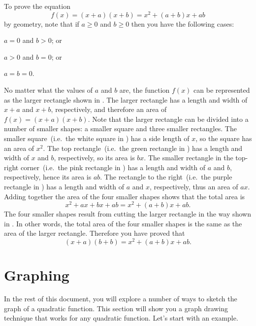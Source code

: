 \documentclass[a4paper,oneside,12pt]{article}
\begin{document}
To prove the equation
\[
f(x)
=
(x + a)(x + b)
=
x^2 + (a + b)x + ab
\]
by geometry, note that if $a \geq 0$ and $b \geq 0$ then you have the
following cases:
\begin{packedenumeral}
\item $a = 0$ and $b > 0$; or

\item $a > 0$ and $b = 0$; or

\item $a = b = 0$.
\end{packedenumeral}
No matter what the values of $a$ and $b$ are, the function $f(x)$ can
be represented as the larger rectangle shown in
.  The larger rectangle has a
length and width of $x + a$ and $x + b$, respectively, and therefore
an area of $f(x) = (x + a)(x + b)$.  Note that the larger rectangle
can be divided into a number of smaller shapes: a smaller square and
three smaller rectangles.  The smaller square~(i.e.~the white square
in ) has a side length of $x$, so
the square has an area of $x^2$.  The top rectangle~(i.e.~the green
rectangle in ) has a length and
width of $x$ and $b$, respectively, so its area is $bx$.  The smaller
rectangle in the top-right corner~(i.e.~the pink rectangle in
) has a length and width of $a$ and
$b$, respectively, hence its area is $ab$.  The rectangle to the
right~(i.e.~the purple rectangle in
) has a length and width of $a$ and
$x$, respectively, thus an area of $ax$.  Adding together the area of
the four smaller shapes shows that the total area is
\[
x^2 + ax + bx + ab
=
x^2 + (a + b)x + ab.
\]
The four smaller shapes result from cutting the larger rectangle in
the way shown in .  In other words,
the total area of the four smaller shapes is the same as the area of
the larger rectangle.  Therefore you have proved that
\[
(x + a) (b + b)
=
x^2 + (a + b)x + ab.
\]



\section{Graphing}
\label{sec:graphing}

In the rest of this document, you will explore a number of ways to
sketch the graph of a quadratic function.  This section will show you
a graph drawing technique that works for any quadratic function.
Let's start with an example.
\end{document}
